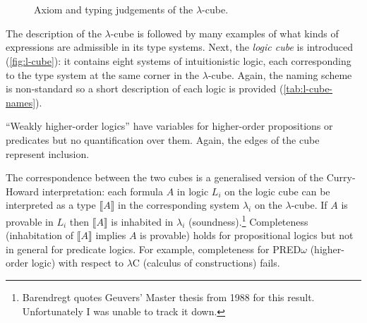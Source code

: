 \documentclass[12pt,toc=bibliography,numbers=noendperiod,
               footnotes=multiple,twoside]{scrartcl}
\begin{document}
\begin{figure}
    \\
    \vspace{10pt}
    \begin{minipage}[b]{.5\linewidth}
        \begin{prooftree}
        \end{prooftree}
    \end{minipage}
    \\
    \vspace{10pt}
    \begin{minipage}[b]{.5\linewidth}
        \begin{prooftree}
        \end{prooftree}
    \end{minipage}
    \caption{Axiom and typing judgements of the \(\lambda\)-cube.}
    \label{fig:lambda-cube-typing}
\end{figure}


The description of the \(\lambda\)-cube is followed by many examples of what kinds of expressions are admissible in its type systems. Next, the \emph{logic cube} is introduced (\cref{fig:l-cube}): it contains eight systems of intuitionistic logic, each corresponding to the type system at the same corner in the \(\lambda\)-cube. Again, the naming scheme is non-standard so a short description of each logic is provided (\cref{tab:l-cube-names}).

\enquote{Weakly higher-order logics} have variables for higher-order propositions or predicates but no quantification over them. Again, the edges of the cube represent inclusion.

The correspondence between the two cubes is a generalised version of the Curry-Howard interpretation: each formula \(A\) in logic \(L_i\) on the logic cube can be interpreted as a type \(\llbracket A \rrbracket\) in the corresponding system \(\lambda_i\) on the \(\lambda\)-cube. If \(A\) is provable in \(L_i\) then \(\llbracket A \rrbracket\) is inhabited in \(\lambda_i\) (soundness).\footnote{Barendregt quotes Geuvers' Master thesis from 1988 for this result. Unfortunately I was unable to track it down.} Completeness (inhabitation of \(\llbracket A \rrbracket\) implies \(A\) is provable) holds for propositional logics but not in general for predicate logics. For example, completeness for PRED\(\omega\) (higher-order logic) with respect to \(\lambda\)C (calculus of constructions) fails.
\end{document}
